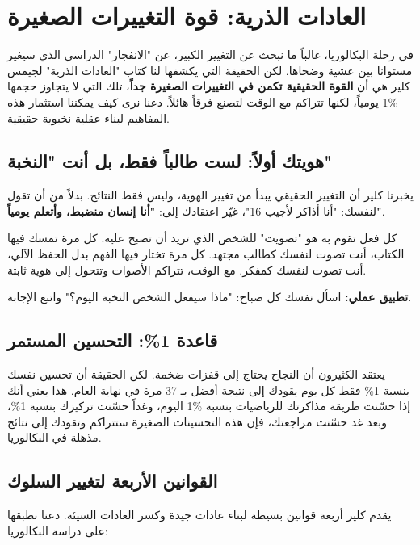 \documentclass[12pt,a4paper]{book}
\begin{document}
	\section{ العادات الذرية: قوة التغييرات الصغيرة}
\label{sec:owner-experiences3}
	
	في رحلة البكالوريا، غالباً ما نبحث عن التغيير الكبير، عن "الانفجار" الدراسي الذي سيغير مستوانا بين عشية وضحاها. لكن الحقيقة التي يكشفها لنا كتاب "العادات الذرية" لجيمس كلير هي أن \textbf{القوة الحقيقية تكمن في التغييرات الصغيرة جداً}، تلك التي لا يتجاوز حجمها \%1 يومياً، لكنها تتراكم مع الوقت لتصنع فرقاً هائلاً. دعنا نرى كيف يمكننا استثمار هذه المفاهيم لبناء عقلية نخبوية حقيقية.
	
	\subsection{هويتك أولاً: لست طالباً فقط، بل أنت "النخبة"}
	يخبرنا كلير أن التغيير الحقيقي يبدأ من تغيير الهوية، وليس فقط النتائج. بدلاً من أن تقول لنفسك: "أنا أذاكر لأجيب 16"، غيّر اعتقادك إلى: \textbf{"أنا إنسان منضبط، وأتعلم يومياً"}.
	
	
	كل فعل تقوم به هو "تصويت" للشخص الذي تريد أن تصبح عليه. كل مرة تمسك فيها الكتاب، أنت تصوت لنفسك كطالب مجتهد. كل مرة تختار فيها الفهم بدل الحفظ الآلي، أنت تصوت لنفسك كمفكر. مع الوقت، تتراكم الأصوات وتتحول إلى هوية ثابتة.
	
	\begin{important}
		\textbf{تطبيق عملي:} اسأل نفسك كل صباح: "ماذا سيفعل الشخص النخبة اليوم؟" واتبع الإجابة.
	\end{important}
	
	\subsection{قاعدة 1\%: التحسين المستمر}
		\label{sec:ta7sin}
	يعتقد الكثيرون أن النجاح يحتاج إلى قفزات ضخمة. لكن الحقيقة أن تحسين نفسك بنسبة 1\% فقط كل يوم يقودك إلى نتيجة أفضل بـ 37 مرة في نهاية العام. هذا يعني أنك إذا حسّنت طريقة مذاكرتك للرياضيات بنسبة \%1 اليوم، وغداً حسّنت تركيزك بنسبة 1\%، وبعد غد حسّنت مراجعتك، فإن هذه التحسينات الصغيرة ستتراكم وتقودك إلى نتائج مذهلة في البكالوريا.
	
	
	\subsection{القوانين الأربعة لتغيير السلوك}
	\label{sec:four-laws-behavior}
	يقدم كلير أربعة قوانين بسيطة لبناء عادات جيدة وكسر العادات السيئة. دعنا نطبقها على دراسة البكالوريا:
	
\end{document}
